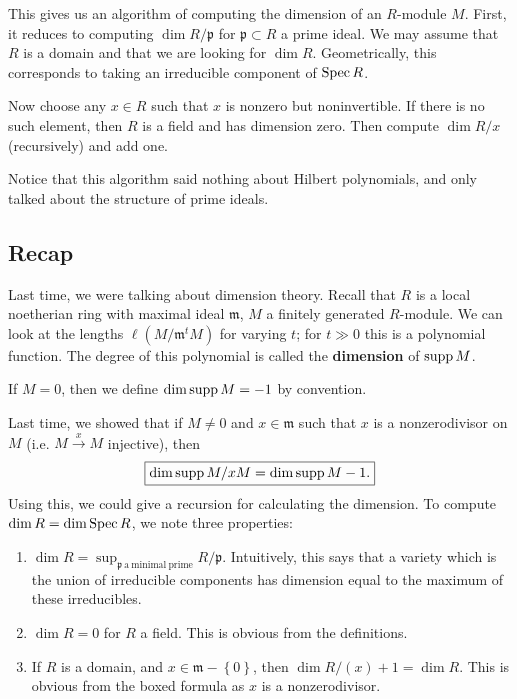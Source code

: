This gives us an algorithm of computing the dimension of an $R$-module $M$. 
First, it reduces to computing $\dim R/\mathfrak{p}$ for $\mathfrak{p} \subset
R$ a prime ideal. We may assume that $R$ is a domain and that we are looking
for $\dim R$. Geometrically, this
corresponds to taking an irreducible component of $\operatorname{Spec} R$.

Now choose any $x
\in R$ such that $x$ is nonzero but noninvertible. If there is no such element,
then $R$ is a field and has dimension zero. Then compute $\dim R/x$
(recursively) and add one.

Notice that this algorithm said nothing about Hilbert polynomials, and only
talked about the structure of prime ideals.

\subsection{Recap}
Last time, we were talking about dimension theory. 
Recall that $R$ is a local noetherian ring with maximal ideal $\mathfrak{m}$,
$M$ a finitely generated $R$-module. We can look at the lengths $\ell(M/\mathfrak{m}^t M)$
for varying $t$; for $t \gg 0$ this is a polynomial function. The degree of
this polynomial is called the \textbf{dimension} of $\operatorname{supp} M$. 

\begin{remark} 
If $M = 0$, then we define $\dim \operatorname{supp} M = -1$ by convention.
\end{remark} 

Last time, we showed that if $M \neq 0$ and $x \in \mathfrak{m}$ such that $x$
is a nonzerodivisor on $M$ (i.e. $M \stackrel{x}{\to} M$ injective), then 
\[ \boxed{ \dim \operatorname{supp} M/xM = \dim \operatorname{supp} M - 1.}\]
Using this, we could give a recursion for calculating the dimension. 
To compute $\dim R = \dim \operatorname{Spec} R$, we note three properties:
\begin{enumerate}
\item $\dim R = \sup_{\mathfrak{p} \ \mathrm{a \ minimal \ prime}}
R/\mathfrak{p}$. Intuitively, this says that a variety which is the union of
irreducible components has dimension equal to the maximum of these irreducibles.
\item $\dim R = 0$ for $R$  a field. This is obvious from the definitions.
\item If $R$ is a domain, and $x \in \mathfrak{m} - \left\{0\right\}$, then
$\dim R/(x) +1 = \dim R $. This is obvious from the boxed formula as $x$ is a nonzerodivisor.
\end{enumerate}

